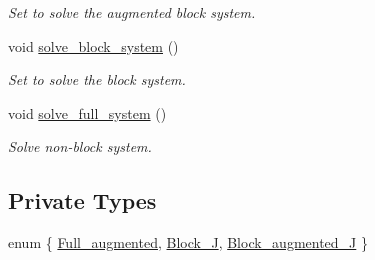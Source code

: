 \begin{DoxyCompactItemize}
\begin{DoxyCompactList}\small\item\em Set to solve the augmented block system. \end{DoxyCompactList}\item 
void \hyperlink{classoomph_1_1FoldHandler_abf0c7293014112731f0482e464f4daa3}{solve\+\_\+block\+\_\+system} ()
\begin{DoxyCompactList}\small\item\em Set to solve the block system. \end{DoxyCompactList}\item 
void \hyperlink{classoomph_1_1FoldHandler_a506c9a7bb372c6d8799c6dabc9448f46}{solve\+\_\+full\+\_\+system} ()
\begin{DoxyCompactList}\small\item\em Solve non-\/block system. \end{DoxyCompactList}\end{DoxyCompactItemize}
\subsection*{Private Types}
\begin{DoxyCompactItemize}
\item 
enum \{ \hyperlink{classoomph_1_1FoldHandler_a860a661fa02e4f000292fa19ea94df3eab20273d36c24fa39780d04503ff186c5}{Full\+\_\+augmented}, 
\hyperlink{classoomph_1_1FoldHandler_a860a661fa02e4f000292fa19ea94df3ea28dfb90a98027e2204ea1872c498454c}{Block\+\_\+J}, 
\hyperlink{classoomph_1_1FoldHandler_a860a661fa02e4f000292fa19ea94df3eaf82a4e892f7e8ed53e41dc82acbc92cd}{Block\+\_\+augmented\+\_\+J}
 \}
\end{DoxyCompactItemize}
